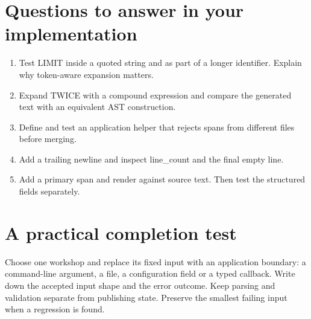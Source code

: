 \section*{Questions to answer in your implementation}
\begin{enumerate}
\item Test LIMIT inside a quoted string and as part of a longer identifier. Explain why token-aware expansion matters.
\item Expand TWICE with a compound expression and compare the generated text with an equivalent AST construction.
\item Define and test an application helper that rejects spans from different files before merging.
\item Add a trailing newline and inspect line\_count and the final empty line.
\item Add a primary span and render against source text. Then test the structured fields separately.
\end{enumerate}
\section*{A practical completion test}
Choose one workshop and replace its fixed input with an application boundary: a command-line argument, a file, a configuration field or a typed callback. Write down the accepted input shape and the error outcome. Keep parsing and validation separate from publishing state. Preserve the smallest failing input when a regression is found.

